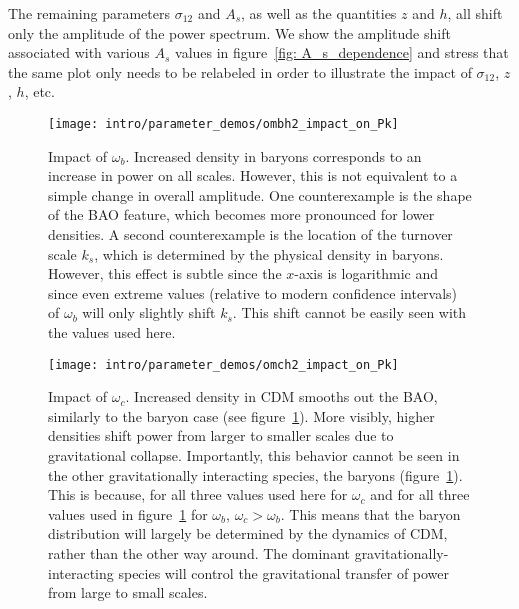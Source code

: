 The remaining parameters $\sigma_{12}$ and $A_s$, as well as the quantities 
$z$ and $h$, all shift only the amplitude of the power spectrum. We show the 
amplitude shift associated with various $A_s$ values in figure~\ref{fig: 
A_s_dependence} and stress that the same plot only needs to be relabeled in 
order to illustrate the impact of $\sigma_{12}$, $z$, $h$, etc. 

\begin{figure}[htb]
  \centering
  \texttt{[image: intro/parameter\_demos/ombh2\_impact\_on\_Pk]}
  \caption[Impact of $\omega_b$ on $P(k)$]{Impact of $\omega_b$. Increased
  	density in baryons corresponds to an increase in power on all scales.
  	However, this is not equivalent to a simple change in overall amplitude.
  	One counterexample is the shape of the BAO feature, which becomes more
  	pronounced for lower densities. A second counterexample is the location
  	of the turnover scale $k_s$, which is determined by the physical density
  	in baryons. However, this effect is subtle since the $x$-axis is
  	logarithmic and since even extreme values (relative to modern confidence
  	intervals) of $\omega_b$ will only slightly shift $k_s$. This shift
  	cannot be easily seen with the values used here.} 
  \label{fig: omega_b_dependence}
\end{figure}

\begin{figure}[htb]
  \centering
  \texttt{[image: intro/parameter\_demos/omch2\_impact\_on\_Pk]}
  \caption[Impact of $\omega_c$ on $P(k)$]{Impact of $\omega_c$. Increased
  	density in CDM smooths out the BAO, similarly to the baryon case
  	(see figure~\ref{fig: omega_b_dependence}). More visibly, higher
  	densities shift power from larger to smaller scales due to gravitational 
  	collapse. Importantly, this behavior cannot be seen in the other
  	gravitationally interacting species, the baryons
  	(figure~\ref{fig: omega_b_dependence}). This is because, for all three
  	values used here for $\omega_c$ and for all three values used in
  	figure~\ref{fig: omega_b_dependence} for $\omega_b$,
  	$\omega_c > \omega_b$. This means that the baryon distribution will
  	largely be determined by the dynamics of CDM, rather than the
  	other way around. The dominant gravitationally-interacting species will
  	control the gravitational transfer of power from large to small scales.}
  \label{fig: omega_c_dependence}
\end{figure}


